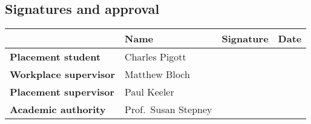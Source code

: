 \documentclass[12pt,a4paper]{article}
\begin{document}
\subsection*{Signatures and approval}
\def\arraystretch{2}
\noindent\begin{tabularx}{\textwidth}{llXl}
	 & Name & Signature & Date \\
	\toprule
	\textbf{Placement student}    & Charles Pigott      & & \\
	\midrule
	\textbf{Workplace supervisor} & Matthew Bloch       & & \\
	\midrule
	\textbf{Placement supervisor} & Paul Keeler         & & \\
	\midrule
	\textbf{Academic authority}   & Prof.~Susan Stepney & & \\
	\bottomrule
\end{tabularx}
\end{document}
